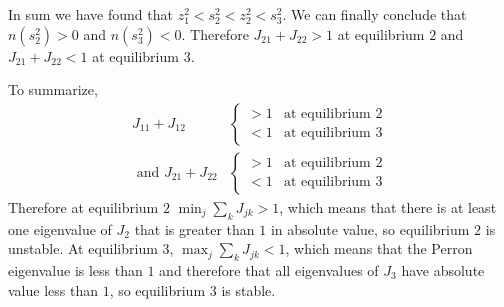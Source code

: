 \documentclass{article}
\begin{document}
\begin{enumerate}
In sum we have found that $z_1^2<s_2^2<z_2^2<s_3^2$. We can finally conclude that $n(s_2^2)>0$ and $n(s_3^2)<0$. Therefore $J_{21}+J_{22}>1$ at equilibrium $2$ and $J_{21}+J_{22}<1$ at equilibrium $3$. 

To summarize,
\begin{align*}
J_{11}+J_{12}&\left\{\begin{array}{cc}>1 & \text{at equilibrium $2$}
\\<1 & \text{at equilibrium $3$}
 \end{array}\right.
 \\\text{ and }J_{21}+J_{22}&\left\{\begin{array}{cc}>1 & \text{at equilibrium $2$}
\\<1 & \text{at equilibrium $3$}
 \end{array}\right.
\end{align*}
Therefore at equilibrium $2$ $\min_j\sum_k J_{jk}>1$, which means that there is at least one eigenvalue of $J_2$ that is greater than $1$ in absolute value, so equilibrium $2$ is unstable. At equilibrium $3$, $\max_j\sum_k J_{jk}<1$, which means that the Perron eigenvalue is less than $1$ and therefore that all eigenvalues of $J_3$ have absolute value less than $1$, so equilibrium $3$ is stable.


\end{enumerate}
\end{document}
